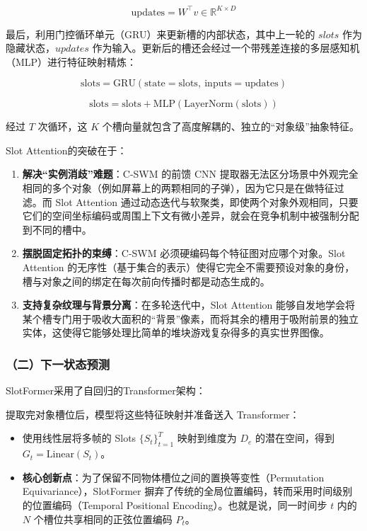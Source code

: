 \[
\mathrm{updates} = W^\top v \in \mathbb{R}^{K\times D}
\]

最后，利用门控循环单元（GRU）来更新槽的内部状态，其中上一轮的 \(slots\) 作为隐藏状态，\(updates\) 作为输入。更新后的槽还会经过一个带残差连接的多层感知机（MLP）进行特征映射精炼：

\[
\mathrm{slots} = \mathrm{GRU}(\mathrm{state}=\mathrm{slots},\ \mathrm{inputs}=\mathrm{updates})
\]

\[
\mathrm{slots} = \mathrm{slots} + \mathrm{MLP}(\mathrm{LayerNorm}(\mathrm{slots}))
\]

经过 \(T\) 次循环，这 \(K\) 个槽向量就包含了高度解耦的、独立的``对象级''抽象特征。

Slot Attention的突破在于：

\begin{enumerate}
\def\labelenumi{\arabic{enumi}.}
\item
  \textbf{解决``实例消歧''难题}：C-SWM 的前馈 CNN 提取器无法区分场景中外观完全相同的多个对象（例如屏幕上的两颗相同的子弹），因为它只是在做特征过滤。而 Slot Attention 通过动态迭代与软聚类，即使两个对象外观相同，只要它们的空间坐标编码或周围上下文有微小差异，就会在竞争机制中被强制分配到不同的槽中。
\item
  \textbf{摆脱固定拓扑的束缚}：C-SWM 必须硬编码每个特征图对应哪个对象。Slot Attention 的无序性（基于集合的表示）使得它完全不需要预设对象的身份，槽与对象之间的绑定在每次前向传播时都是动态生成的。
\item
  \textbf{支持复杂纹理与背景分离}：在多轮迭代中，Slot Attention 能够自发地学会将某个槽专门用于吸收大面积的``背景''像素，而将其余的槽用于吸附前景的独立实体，这使得它能够处理比简单的堆块游戏复杂得多的真实世界图像。
\end{enumerate}

\hypertarget{ux4e8cux4e0bux4e00ux72b6ux6001ux9884ux6d4b}{%
\subsubsection{（二）下一状态预测}\label{ux4e8cux4e0bux4e00ux72b6ux6001ux9884ux6d4b}}

SlotFormer采用了自回归的Transformer架构：

提取完对象槽位后，模型将这些特征映射并准备送入 Transformer：

\begin{itemize}
\tightlist
\item
  使用线性层将多帧的 Slots \(\{S_t\}_{t=1}^{T}\) 映射到维度为 \(D_e\) 的潜在空间，得到 \(G_t = \mathrm{Linear}(S_t)\)。
\item
  \textbf{核心创新点}：为了保留不同物体槽位之间的置换等变性（Permutation Equivariance），SlotFormer 摒弃了传统的全局位置编码，转而采用时间级别的位置编码（Temporal Positional Encoding）。也就是说，同一时间步 \(t\) 内的 \(N\) 个槽位共享相同的正弦位置编码 \(P_t\)。
\end{itemize}

